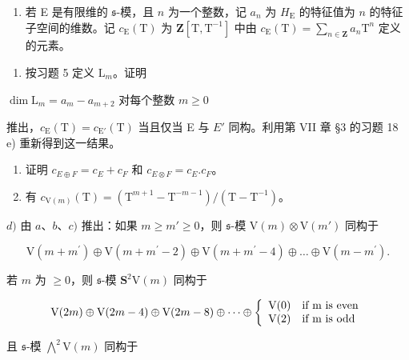 \begin{enumerate}
\def\labelenumi{\arabic{enumi})}
\setcounter{enumi}{5}
\tightlist
\item
  若 E 是有限维的 \(\mathfrak{s}\)-模，且 \(n\) 为一个整数，记 \(a_{n}\) 为 \(H_{\mathrm{E}}\) 的特征值为 \(n\) 的特征子空间的维数。记 \(c_{\mathrm{E}}(\mathrm{T})\) 为 \(\mathbf{Z}[\mathrm{T},\mathrm{T}^{-1}]\) 中由 \(c_{\mathrm{E}}(\mathrm{T}) = \sum_{n\in \mathbf{Z}}a_n\mathrm{T}^n\) 定义的元素。
\end{enumerate}

\begin{enumerate}
\def\labelenumi{\alph{enumi})}
\tightlist
\item
  按习题 5 定义 \(\mathrm{L}_m\)。证明
\end{enumerate}

\(\dim \mathrm{L}_m = a_m - a_{m + 2}\) 对每个整数 \(m\geq 0\)

推出，\(c_{\mathrm{E}}(\mathrm{T}) = c_{\mathrm{E}'}(\mathrm{T})\) 当且仅当 E 与 \(E'\) 同构。利用第 VII 章 §3 的习题 18 e) 重新得到这一结果。

\begin{enumerate}
\def\labelenumi{\alph{enumi})}
\setcounter{enumi}{1}
\item
  证明 \(c_{E\oplus F} = c_{E} + c_{F}\) 和 \(c_{E\otimes F} = c_{E}.c_{F}\)。
\item
  有 \(c_{\mathrm{V}(m)}(\mathrm{T}) = (\mathrm{T}^{m + 1} - \mathrm{T}^{-m - 1}) / (\mathrm{T} - \mathrm{T}^{-1})\)。
\end{enumerate}

\(d)\) 由 \(a\)、\(b\)、\(c)\) 推出：如果 \(m \geq m' \geq 0\)，则 \(\mathfrak{s}\)-模 \(\mathrm{V}(m) \otimes \mathrm{V}(m')\) 同构于

\[
\mathrm{V} (m + m ^ {\prime}) \oplus \mathrm{V} (m + m ^ {\prime} - 2) \oplus \mathrm{V} (m + m ^ {\prime} - 4) \oplus \dots \oplus \mathrm{V} (m - m ^ {\prime}).
\]

若 \(m\) 为 \(\geq 0\)，则 \(\mathfrak{s}\)-模 \(\mathbf{S}^2\mathrm{V}(m)\) 同构于

\[
\mathrm{V} (2 m) \oplus \mathrm{V} (2 m - 4) \oplus \mathrm{V} (2 m - 8) \oplus \dots \oplus \left\{ \begin{array}{l l} \mathrm{V} (0) & \text {if m is even} \\ \mathrm{V} (2) & \text {if m is odd} \end{array} \right.
\]

且 \(\mathfrak{s}\)-模 \(\bigwedge^2\mathrm{V}(m)\) 同构于

